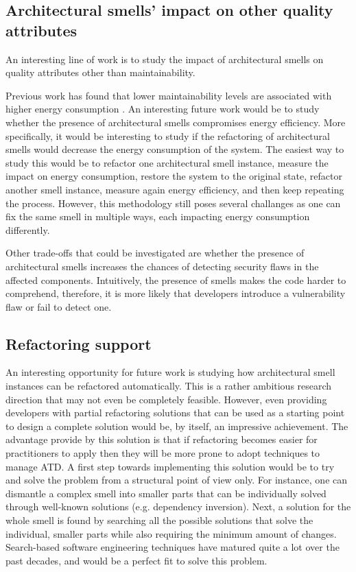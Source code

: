\subsection{Architectural smells' impact on other quality attributes}
An interesting line of work is to study the impact of architectural smells on quality attributes other than maintainability.

Previous work has found that lower maintainability levels are associated with higher energy consumption \cite{Papadopoulos2018}.
An interesting future work would be to study whether the presence of architectural smells compromises energy efficiency.
More specifically, it would be interesting to study if the refactoring of architectural smells would decrease the energy consumption of the system.
The easiest way to study this would be to refactor one architectural smell instance, measure the impact on energy consumption, restore the system to the original state, refactor another smell instance, measure again energy efficiency, and then keep repeating the process.
However, this methodology still poses several challanges as one can fix the same smell in multiple ways, each impacting energy consumption differently.

Other trade-offs that could be investigated are whether the presence of architectural smells increases the chances of detecting security flaws in the affected components.
Intuitively, the presence of smells makes the code harder to comprehend, therefore, it is more likely that developers introduce a vulnerability flaw or fail to detect one. 

\subsection{Refactoring support}
An interesting opportunity for future work is studying how architectural smell instances can be refactored automatically.
This is a rather ambitious research direction that may not even be completely feasible.
However, even providing developers with partial refactoring solutions that can be used as a starting point to design a complete solution would be, by itself, an impressive achievement. 
The advantage provide by this solution is that if refactoring becomes easier for practitioners to apply then they will be more prone to adopt techniques to manage ATD.
A first step towards implementing this solution would be to try and solve the problem from a structural point of view only. 
For instance, one can dismantle a complex smell into smaller parts that can be individually solved through well-known solutions (e.g. dependency inversion).
Next, a solution for the whole smell is found by searching all the possible solutions that solve the individual, smaller parts while also requiring the minimum amount of changes. 
Search-based software engineering techniques have matured quite a lot over the past decades, and would be a perfect fit to solve this problem.

